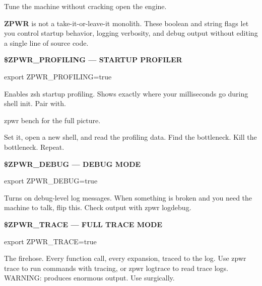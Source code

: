 \documentclass[11pt,a4paper,twoside]{book}
\begin{document}
Tune the machine without cracking open the engine.

\textbf{ZPWR} is not a take-it-or-leave-it monolith. These boolean and string flags let you control startup behavior, logging verbosity, and debug output without editing a single line of source code.


\vspace{12pt}
{\bfseries\color{neonyellow} \$\textbf{ZPWR\_PROFILING} — STARTUP PROFILER}\vspace{4pt}

\begin{codebox}
\color{neongreen}export ZPWR\_PROFILING=true\\
\end{codebox}

Enables zsh startup profiling. Shows exactly where your milliseconds go during shell init. Pair with.

\begin{codebox}
\color{neongreen}zpwr bench for the full picture.\\
\end{codebox}

Set it, open a new shell, and read the profiling data. Find the bottleneck. Kill the bottleneck. Repeat.


\vspace{12pt}
{\bfseries\color{neonyellow} \$\textbf{ZPWR\_DEBUG} — DEBUG MODE}\vspace{4pt}

\begin{codebox}
\color{neongreen}export ZPWR\_DEBUG=true\\
\end{codebox}

Turns on debug-level log messages. When something is broken and you need the machine to talk, flip this. Check output with zpwr logdebug.


\vspace{12pt}
{\bfseries\color{neonyellow} \$\textbf{ZPWR\_TRACE} — FULL TRACE MODE}\vspace{4pt}

\begin{codebox}
\color{neongreen}export ZPWR\_TRACE=true\\
\end{codebox}

The firehose. Every function call, every expansion, traced to the log. Use zpwr trace to run commands with tracing, or zpwr logtrace to read trace logs. WARNING: produces enormous output. Use surgically.
\end{document}
